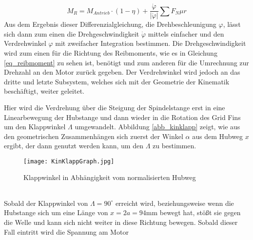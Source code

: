 \begin{equation}\label{eq_reibmoment}
	M_R = M_{Antrieb}\cdot(1-\eta)+\frac{\dot{\varphi}}{|\dot{\varphi}|}\sum F_N \mu r
\end{equation}
Aus dem Ergebnis dieser Differenzialgleichung, die Drehbeschleunigung $\varphi$, lässt sich dann zum einen die Drehgeschwindigkeit $\dot{\varphi}$ mittels einfacher und den Verdrehwinkel $\varphi$ mit zweifacher Integration bestimmen. Die Drehgeschwindigkeit wird zum einen für die Richtung des Reibmoments, wie es in Gleichung \ref{eq_reibmoment} zu sehen ist, benötigt und zum anderen für die Umrechnung zur Drehzahl an den Motor zurück gegeben. Der Verdrehwinkel wird jedoch an das dritte und letzte Subsystem, welches sich mit der Geometrie der Kinematik beschäftigt, weiter geleitet.

Hier wird die Verdrehung über die Steigung der Spindelstange erst in eine Linearbewegung der Hubstange und dann wieder in die Rotation des Grid Fins um den Klappwinkel $\Lambda$ umgewandelt. Abbildung \ref{abb_kinklapp} zeigt, wie aus den geometrischen Zusammenhängen sich zuerst der Winkel $\alpha$ aus dem Hubweg $x$ ergibt, der dann genutzt werden kann, um den $\Lambda$ zu bestimmen.
\begin{figure}[h] 
\centering
\texttt{[image: KinKlappGraph.jpg]}
\caption{Klappwinkel in Abhängigkeit vom normalisierten Hubweg}
\end{figure}\\	
Sobald der Klappwinkel von $\Lambda = 90^\circ$ erreicht wird, beziehungsweise wenn die Hubstange sich um eine Länge von $x = 2a = 94$mm bewegt hat, stößt sie gegen die Welle und kann sich nicht weiter in diese Richtung bewegen. Sobald dieser Fall eintritt wird die Spannung am Motor




